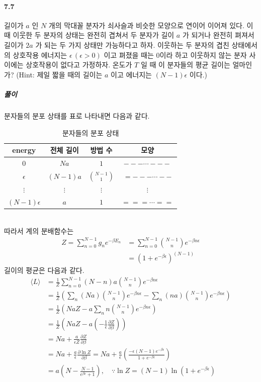 \documentclass[a4paper,12pt]{report}
\begin{document}
	\paragraph{7.7 } 길이가 $a$ 인 $N$ 개의 막대꼴 분자가 쇠사슬과 비슷한 모양으로 연이어 이어져 있다. 이때 이웃한 두 분자의 상태는 완전히 겹쳐서 두 분자가 길이 $a$ 가 되거나 완전히 펴져서 길이가 $2a$ 가 되는 두 가지 상태만 가능하다고 하자. 이웃하는 두 분자의 겹친 상태에서의 상호작용 에너지는 $\epsilon\, (\epsilon>0)$ 이고 펴졌을 때는 0이라 하고 이웃하지 않는 분자 사이에는 상호작용이 없다고 가정하자. 온도가 $T$ 일 때 이 분자들의 평균 길이는 얼마인가? (Hint: 제일 짧을 때의 길이는 $a$ 이고 에너지는 $(N-1)\epsilon$ 이다.)
	\subparagraph{풀이}분자들의 분포 상태를 표로 나타내면 다음과 같다. 
	\begin{table}[h]
		\caption{분자들의 분포 상태}
		\begin{center}
			\begin{tabular}{|cccc|}\hline
				energy&전체 길이& 방법 수& 모양\\ \hline
				$0$&$Na$&$1$&$---\cdots---$\\ \hline
				$\epsilon$&$(N-1)a$&${N-1\choose1}$&$=---\cdots--$ \\ \hline
				$\vdots$&$\vdots$&$\vdots$&$\vdots$ \\ \hline
				$(N-1)\epsilon$&$a$&$1$&$===\cdots==$ \\ \hline
			\end{tabular}
		\end{center}
	\end{table}\\
	따라서 계의 분배함수는
	\begin{equation*}
		\begin{split}
		Z=\sum_{n=0}^{N-1}g_ne^{-\beta E_n}&=\sum_{n=0}^{N-1}{N-1\choose n}e^{-\beta n\epsilon}\\
		&=\left(1+e^{-\beta\epsilon} \right)^{(N-1)} 
		\end{split}
	\end{equation*}
	길이의 평균은 다음과 같다.
	\begin{equation*}
		\begin{split}
		\langle L\rangle&=\frac{1}{Z}\sum_{n=0}^{N-1}(N-n)a{N-1\choose n}e^{-\beta n \epsilon}\\
		&=\frac{1}{Z}\left(\sum_{n}(Na){N-1\choose n}e^{-\beta n\epsilon}-\sum_{n}(na){N-1\choose n}e^{-\beta n \epsilon} \right) \\
		&=\frac{1}{Z}\left(NaZ-a\sum_{n}n{N-1\choose n}e^{-\beta n \epsilon} \right) \\
		&=\frac{1}{Z}\left(NaZ-a\left(-\frac{1}{\epsilon}\frac{\partial Z}{\partial \beta} \right)  \right) \\
		&=Na+\frac{a}{\epsilon Z}\frac{\partial Z}{\partial \beta}\\
		&=Na+\frac{a}{\epsilon}\frac{\partial \ln Z}{\partial \beta}=Na+\frac{a}{\epsilon}\left(\frac{-\epsilon(N-1)e^{-\beta\epsilon}}{1+e^{-\beta\epsilon}} \right) \\
		&=a\left(N-\frac{N-1}{e^{\beta \epsilon}+1} \right) ,\quad \because\ln Z=(N-1)\ln(1+e^{-\beta\epsilon})
		\end{split}
	\end{equation*}
\end{document}

